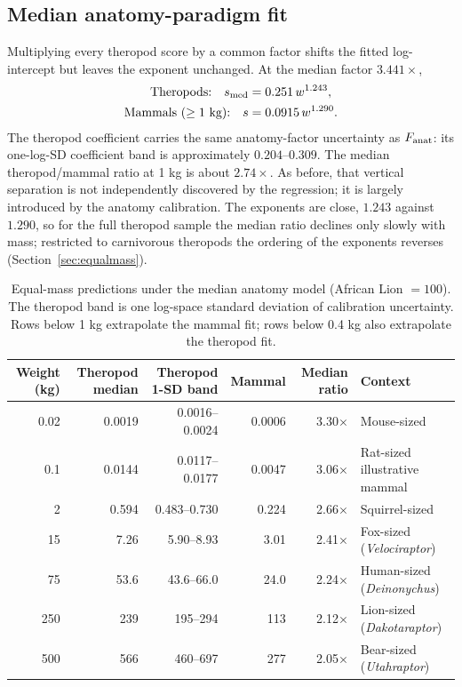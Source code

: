 \documentclass[11pt]{article}
\begin{document}
\subsection{Median anatomy-paradigm fit}
Multiplying every theropod score by a common factor shifts the fitted log-intercept but leaves the exponent unchanged. At the median factor $3.441\times$,
\begin{align}
\text{Theropods:}\quad s_{\rm med} &= 0.251\,w^{1.243}, \\
\text{Mammals ($\geq1$ kg):}\quad s &= 0.0915\,w^{1.290}.
\end{align}
The theropod coefficient carries the same anatomy-factor uncertainty as $F_{\rm anat}$: its one-log-SD coefficient band is approximately $0.204$--$0.309$. The median theropod/mammal ratio at 1 kg is about $2.74\times$. As before, that vertical separation is not independently discovered by the regression; it is largely introduced by the anatomy calibration. The exponents are close, $1.243$ against $1.290$, so for the full theropod sample the median ratio declines only slowly with mass; restricted to carnivorous theropods the ordering of the exponents reverses (Section~\ref{sec:equalmass}).

\begin{table}[H]
\centering
\footnotesize
\setlength{\tabcolsep}{4pt}
\begin{tabular}{rrrrrl}
\toprule
Weight (kg) & Theropod median & Theropod 1-SD band & Mammal & Median ratio & Context \\
\midrule
0.02 & 0.0019 & 0.0016--0.0024 & 0.0006 & 3.30$\times$ & Mouse-sized \\
0.1 & 0.0144 & 0.0117--0.0177 & 0.0047 & 3.06$\times$ & Rat-sized illustrative mammal \\
2 & 0.594 & 0.483--0.730 & 0.224 & 2.66$\times$ & Squirrel-sized \\
15 & 7.26 & 5.90--8.93 & 3.01 & 2.41$\times$ & Fox-sized (\textit{Velociraptor}) \\
75 & 53.6 & 43.6--66.0 & 24.0 & 2.24$\times$ & Human-sized (\textit{Deinonychus}) \\
250 & 239 & 195--294 & 113 & 2.12$\times$ & Lion-sized (\textit{Dakotaraptor}) \\
500 & 566 & 460--697 & 277 & 2.05$\times$ & Bear-sized (\textit{Utahraptor}) \\
\bottomrule
\end{tabular}
\caption{Equal-mass predictions under the median anatomy model (African Lion $=100$). The theropod band is one log-space standard deviation of calibration uncertainty. Rows below 1 kg extrapolate the mammal fit; rows below 0.4 kg also extrapolate the theropod fit.}
\label{tab:darkera}
\end{table}
\end{document}
